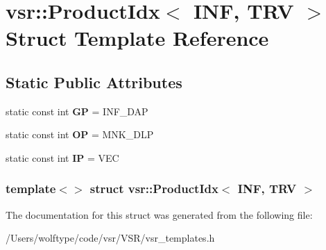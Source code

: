 \hypertarget{structvsr_1_1_product_idx_3_01_i_n_f_00_01_t_r_v_01_4}{\section{vsr\-:\-:Product\-Idx$<$ I\-N\-F, T\-R\-V $>$ Struct Template Reference}
\label{structvsr_1_1_product_idx_3_01_i_n_f_00_01_t_r_v_01_4}
}
\subsection*{Static Public Attributes}
\begin{DoxyCompactItemize}
\item 
\hypertarget{structvsr_1_1_product_idx_3_01_i_n_f_00_01_t_r_v_01_4_a07bab6f3a321883abfa01fa3d63a4148}{static const int {\bfseries G\-P} = I\-N\-F\-\_\-\-D\-A\-P}\label{structvsr_1_1_product_idx_3_01_i_n_f_00_01_t_r_v_01_4_a07bab6f3a321883abfa01fa3d63a4148}

\item 
\hypertarget{structvsr_1_1_product_idx_3_01_i_n_f_00_01_t_r_v_01_4_a705d8273877549f98c9a441090947620}{static const int {\bfseries O\-P} = M\-N\-K\-\_\-\-D\-L\-P}\label{structvsr_1_1_product_idx_3_01_i_n_f_00_01_t_r_v_01_4_a705d8273877549f98c9a441090947620}

\item 
\hypertarget{structvsr_1_1_product_idx_3_01_i_n_f_00_01_t_r_v_01_4_a505441da3f05eb3662e5823ce275a269}{static const int {\bfseries I\-P} = V\-E\-C}\label{structvsr_1_1_product_idx_3_01_i_n_f_00_01_t_r_v_01_4_a505441da3f05eb3662e5823ce275a269}

\end{DoxyCompactItemize}
\subsubsection*{template$<$$>$ struct vsr\-::\-Product\-Idx$<$ I\-N\-F, T\-R\-V $>$}



The documentation for this struct was generated from the following file\-:\begin{DoxyCompactItemize}
\item 
/\-Users/wolftype/code/vsr/\-V\-S\-R/vsr\-\_\-templates.\-h\end{DoxyCompactItemize}
